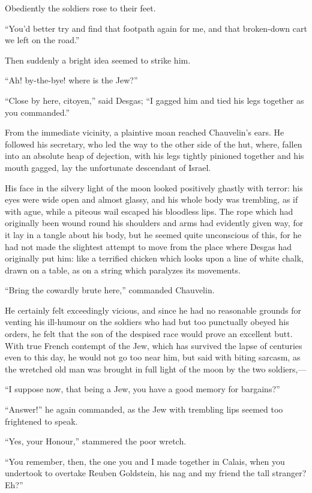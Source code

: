 \documentclass[paper=5.5in:8.5in,BCOR=7mm,twoside,DIV=calc,12pt,usegeometry,chapterprefix,endperiod,headings=big]{scrbook}
\begin{document}
Obediently the soldiers rose to their feet.

\enquote{You'd better try and find that footpath again for me, and that broken-down cart we left on the road.}

Then suddenly a bright idea seemed to strike him.

\enquote{Ah! by-the-bye! where is the Jew?}

\enquote{Close by here, citoyen,} said Desgas; \enquote{I gagged him and tied his legs together as you commanded.}

From the immediate vicinity, a plaintive moan reached Chauvelin's ears. He followed his secretary, who led the way to the other side of the hut, where, fallen into an absolute heap of dejection, with his legs tightly pinioned together and his mouth gagged, lay the unfortunate descendant of Israel.

His face in the silvery light of the moon looked positively ghastly with terror: his eyes were wide open and almost glassy, and his whole body was trembling, as if with ague, while a piteous wail escaped his bloodless lips. The rope which had originally been wound round his shoulders and arms had evidently given way, for it lay in a tangle about his body, but he seemed quite unconscious of this, for he had not made the slightest attempt to move from the place where Desgas had originally put him: like a terrified chicken which looks upon a line of white chalk, drawn on a table, as on a string which paralyzes its movements.

\enquote{Bring the cowardly brute here,} commanded Chauvelin.

He certainly felt exceedingly vicious, and since he had no reasonable grounds for venting his ill-humour on the soldiers who had but too punctually obeyed his orders, he felt that the son of the despised race would prove an excellent butt. With true French contempt of the Jew, which has survived the lapse of centuries even to this day, he would not go too near him, but said with biting sarcasm, as the wretched old man was brought in full light of the moon by the two soldiers,---

\enquote{I suppose now, that being a Jew, you have a good memory for bargains?}

\enquote{Answer!} he again commanded, as the Jew with trembling lips seemed too frightened to speak.

\enquote{Yes, your Honour,} stammered the poor wretch.

\enquote{You remember, then, the one you and I made together in Calais, when you undertook to overtake Reuben Goldstein, his nag and my friend the tall stranger? Eh?}
\end{document}
